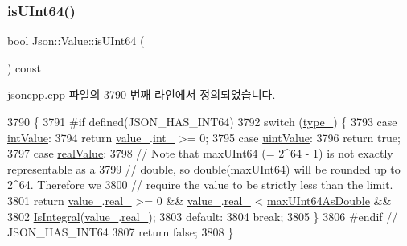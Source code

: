 \subsubsection{\texorpdfstring{is\+U\+Int64()}{isUInt64()}}
{\footnotesize\ttfamily bool Json\+::\+Value\+::is\+U\+Int64 (\begin{DoxyParamCaption}{ }\end{DoxyParamCaption}) const}



jsoncpp.\+cpp 파일의 3790 번째 라인에서 정의되었습니다.


\begin{DoxyCode}
3790                            \{
3791 \textcolor{preprocessor}{#if defined(JSON\_HAS\_INT64)}
3792   \textcolor{keywordflow}{switch} (\hyperlink{class_json_1_1_value_abd222c2536dc88bf330dedcd076d2356}{type\_}) \{
3793   \textcolor{keywordflow}{case} \hyperlink{namespace_json_a7d654b75c16a57007925868e38212b4eae5a9d708d5c9e23ae9bf98898522512d}{intValue}:
3794     \textcolor{keywordflow}{return} \hyperlink{class_json_1_1_value_aef578244546212705b9f81eb84d7e151}{value\_}.\hyperlink{union_json_1_1_value_1_1_value_holder_adbfb384301298844ed955ba5cf6015a0}{int\_} >= 0;
3795   \textcolor{keywordflow}{case} \hyperlink{namespace_json_a7d654b75c16a57007925868e38212b4eaea788d9a3bb00adc6d68d97d43e1ccd3}{uintValue}:
3796     \textcolor{keywordflow}{return} \textcolor{keyword}{true};
3797   \textcolor{keywordflow}{case} \hyperlink{namespace_json_a7d654b75c16a57007925868e38212b4eab837c7b869c14d8be712deb45c9e490e}{realValue}:
3798     \textcolor{comment}{// Note that maxUInt64 (= 2^64 - 1) is not exactly representable as a}
3799     \textcolor{comment}{// double, so double(maxUInt64) will be rounded up to 2^64. Therefore we}
3800     \textcolor{comment}{// require the value to be strictly less than the limit.}
3801     \textcolor{keywordflow}{return} \hyperlink{class_json_1_1_value_aef578244546212705b9f81eb84d7e151}{value\_}.\hyperlink{union_json_1_1_value_1_1_value_holder_af0c5ca724e5fe3a15db773d750e2351e}{real\_} >= 0 && \hyperlink{class_json_1_1_value_aef578244546212705b9f81eb84d7e151}{value\_}.\hyperlink{union_json_1_1_value_1_1_value_holder_af0c5ca724e5fe3a15db773d750e2351e}{real\_} < 
      \hyperlink{namespace_json_aecc0306aa526f25c5156f842182fb7fb}{maxUInt64AsDouble} &&
3802            \hyperlink{namespace_json_a1a04cc9d31e64b5912dade003c9b99b5}{IsIntegral}(\hyperlink{class_json_1_1_value_aef578244546212705b9f81eb84d7e151}{value\_}.\hyperlink{union_json_1_1_value_1_1_value_holder_af0c5ca724e5fe3a15db773d750e2351e}{real\_});
3803   \textcolor{keywordflow}{default}:
3804     \textcolor{keywordflow}{break};
3805   \}
3806 \textcolor{preprocessor}{#endif // JSON\_HAS\_INT64}
3807   \textcolor{keywordflow}{return} \textcolor{keyword}{false};
3808 \}
\end{DoxyCode}
